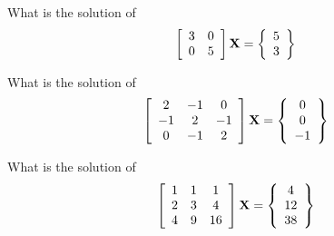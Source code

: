 
\bexo
What is the solution of 
\begin{equation*}
\left[
\begin{array}{cc}
3 & 0 \\
0 & 5
\end{array}
\right]
\textbf{X}=
\left\{
\begin{array}{c}
5 \\
3
\end{array}
\right\}
\end{equation*}
\eexo{}

\bexo

What is the solution of 
\begin{equation*}
\left[
\begin{array}{ccc}
2 & -1&0 \\
-1 & 2&-1\\
0&-1& 2
\end{array}
\right]
\textbf{X}=
\left\{
\begin{array}{c}
0 \\
0\\
-1
\end{array}
\right\}
\end{equation*}
\eexo{}

\bexo

What is the solution of 
\begin{equation*}
\left[
\begin{array}{ccc}
1 & 1&1 \\
2 & 3&4\\
4&9& 16
\end{array}
\right]
\textbf{X}=
\left\{
\begin{array}{c}
4\\
12\\
38
\end{array}
\right\}
\end{equation*}
\eexo{}


